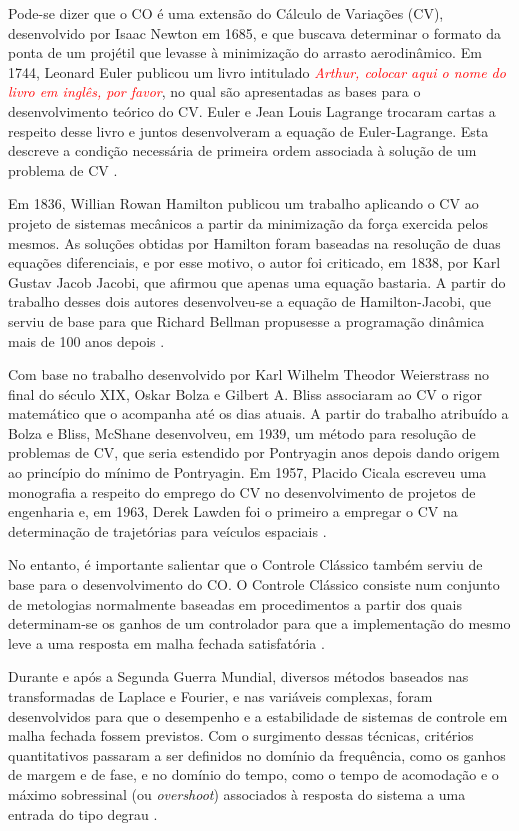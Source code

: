 Pode-se dizer que o CO é uma extensão do Cálculo de Variações (CV), desenvolvido por Isaac Newton em 1685, e que buscava determinar o formato da ponta de um projétil que levasse à minimização do arrasto aerodinâmico. Em 1744, Leonard Euler publicou um livro intitulado \textit{\textcolor{red}{Arthur, colocar aqui o nome do livro em inglês, por favor}}, no qual são apresentadas as bases para o desenvolvimento teórico do CV. Euler e Jean Louis Lagrange trocaram cartas a respeito desse livro e juntos desenvolveram a equação de Euler-Lagrange. Esta descreve a condição necessária de primeira ordem associada à solução de um problema de CV \cite{bryson_optimal_1996}.

Em 1836, Willian Rowan Hamilton publicou um trabalho aplicando o CV ao projeto de sistemas mecânicos a partir da minimização da força exercida pelos mesmos. As soluções obtidas por Hamilton foram baseadas na resolução de duas equações diferenciais, e por esse motivo, o autor foi criticado, em 1838, por Karl Gustav Jacob Jacobi, que afirmou que apenas uma equação bastaria. A partir do trabalho desses dois autores desenvolveu-se a equação de Hamilton-Jacobi, que serviu de base para que Richard Bellman propusesse a programação dinâmica mais de 100 anos depois \cite{bryson_optimal_1996}. 

Com base no trabalho desenvolvido por Karl Wilhelm Theodor Weierstrass no final do século XIX, Oskar Bolza e Gilbert A. Bliss associaram ao CV o rigor matemático que o acompanha até os dias atuais. A partir do trabalho atribuído a Bolza e Bliss, McShane desenvolveu, em 1939, um método para resolução de problemas de CV, que seria estendido por Pontryagin anos depois dando origem ao princípio do mínimo de Pontryagin. Em 1957, Placido Cicala escreveu uma monografia a respeito do emprego do CV no desenvolvimento de projetos de engenharia e, em 1963, Derek Lawden foi o primeiro a empregar o CV na determinação de trajetórias para veículos espaciais \cite{bryson_optimal_1996}. 

No entanto, é importante salientar que o Controle Clássico também serviu de base para o desenvolvimento do CO. O Controle Clássico consiste num conjunto de metologias normalmente baseadas em procedimentos a partir dos quais determinam-se os ganhos de um controlador para que a implementação do mesmo leve a uma resposta em malha fechada satisfatória \cite{bryson_optimal_1996}.

Durante e após a Segunda Guerra Mundial, diversos métodos baseados nas transformadas de Laplace e Fourier, e nas variáveis complexas, foram desenvolvidos para que o desempenho e a estabilidade de sistemas de controle em malha fechada fossem previstos. Com o surgimento dessas técnicas, critérios quantitativos passaram a ser definidos no domínio da frequência, como os ganhos de margem e de fase, e no domínio do tempo, como o tempo de acomodação e o máximo sobressinal (ou \textit{overshoot}) associados à resposta do sistema a uma entrada do tipo degrau \cite{bryson_optimal_1996}.

